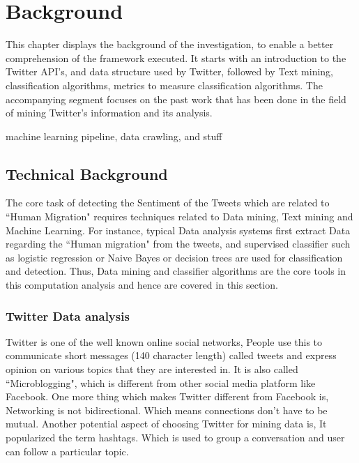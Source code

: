 \chapter{Background}\label{chap:background}
This chapter displays the background of the investigation, to enable a better comprehension of the framework executed. It starts with an introduction to the Twitter API's, and data structure used by Twitter, followed by Text mining, classification algorithms, metrics to measure classification algorithms. The accompanying segment focuses on the past work that has been done in the field of mining Twitter's information and its analysis.

machine learning pipeline, data crawling, and stuff
    
\section{Technical Background}

The core task of detecting the Sentiment of the Tweets which are related to ``Human Migration" requires techniques related to Data mining, Text mining and Machine Learning. For instance, typical Data analysis systems first extract Data regarding the ``Human migration" from the tweets, and supervised classifier such as logistic regression or Naive Bayes or decision trees  are used for classification and detection. Thus, Data mining and classifier algorithms are the core tools in this computation analysis and hence are covered in this section.

\subsection{Twitter Data analysis}

Twitter is one of the well known online social networks, People use this to communicate short messages (140 character length) called tweets and express opinion on various topics that they are interested in. It is also called ``Microblogging", which is different from other social media platform like Facebook. One more thing which makes Twitter different from Facebook is, Networking is not bidirectional. Which means connections don't have to be mutual. Another  potential aspect of choosing Twitter for mining data is, It popularized the term hashtags. Which is used to group a  conversation and user can follow a particular topic.

